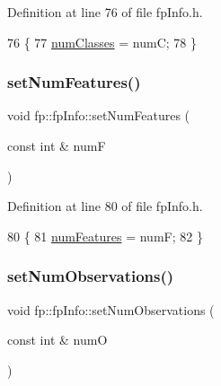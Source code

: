 Definition at line 76 of file fp\+Info.\+h.


\begin{DoxyCode}
76                                                       \{
77                 \hyperlink{classfp_1_1fpInfo_a1c98a9ced12230f21003f78d742625a3}{numClasses} = numC;
78             \}
\end{DoxyCode}
\mbox{\label{classfp_1_1fpInfo_ab8b97144a2a9ebd565d81de4b63f490c}} 
\subsubsection{\texorpdfstring{set\+Num\+Features()}{setNumFeatures()}}
{\footnotesize\ttfamily void fp\+::fp\+Info\+::set\+Num\+Features (\begin{DoxyParamCaption}\item[{const int \&}]{numF }\end{DoxyParamCaption})\hspace{0.3cm}{\ttfamily [inline]}}



Definition at line 80 of file fp\+Info.\+h.


\begin{DoxyCode}
80                                                        \{
81                 \hyperlink{classfp_1_1fpInfo_a6ed8deabebae772fc213730cd29a2e61}{numFeatures} = numF;
82             \}
\end{DoxyCode}
\mbox{\label{classfp_1_1fpInfo_a97b1a91a4b64e8de811adae7313f73af}} 
\subsubsection{\texorpdfstring{set\+Num\+Observations()}{setNumObservations()}}
{\footnotesize\ttfamily void fp\+::fp\+Info\+::set\+Num\+Observations (\begin{DoxyParamCaption}\item[{const int \&}]{numO }\end{DoxyParamCaption})\hspace{0.3cm}{\ttfamily [inline]}}



